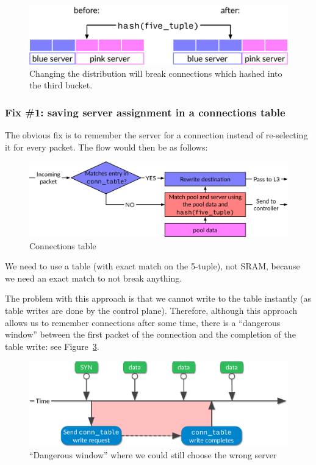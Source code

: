 \documentclass[11pt,oneside,a4paper]{article}
\begin{document}
\begin{figure}[h]
\centering
\includegraphics[width=.5\textwidth]{figures/hash-problem.pdf}
\caption{Changing the distribution will break connections which hashed into the
    third bucket.}
\label{fig:hash-problem}
\end{figure}

\subsubsection{Fix \#1: saving server assignment in a connections table}

The obvious fix is to remember the server for a connection instead of
re-selecting it for every packet.
The flow would then be as follows:

\begin{figure}[h]
\centering
\includegraphics[width=.5\textwidth]{figures/connections.pdf}
\caption{Connections table}
\label{fig:connections}
\end{figure}

We need to use a table (with exact match on the 5-tuple), not SRAM, because we
need an exact match to not break anything.

The problem with this approach is that we cannot write to the table instantly
(as table writes are done by the control plane).
Therefore, although this approach allows us to remember connections after some
time, there is a ``dangerous window'' between the first packet of the connection
and the completion of the table write: see Figure~\ref{fig:timeline}.

\begin{figure}[h]
\centering
\includegraphics[width=.5\textwidth]{figures/timeline.pdf}
\caption{``Dangerous window'' where we could still choose the wrong
    server}
\label{fig:timeline}
\end{figure}
\end{document}
